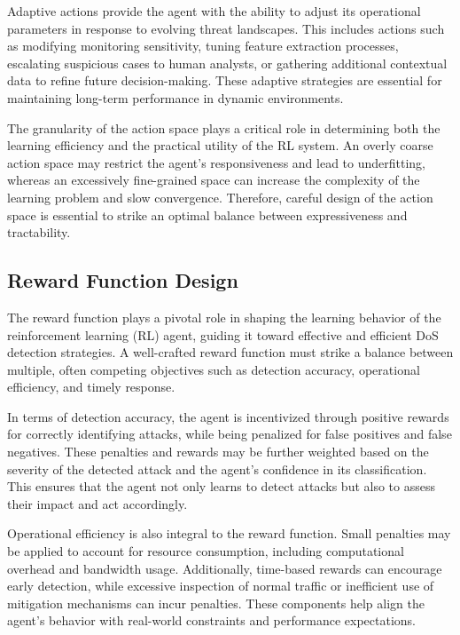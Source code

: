 \documentclass[12pt]{report}
\begin{document}
Adaptive actions provide the agent with the ability to adjust its operational parameters in response to evolving threat landscapes. This includes actions such as modifying monitoring sensitivity, tuning feature extraction processes, escalating suspicious cases to human analysts, or gathering additional contextual data to refine future decision-making. These adaptive strategies are essential for maintaining long-term performance in dynamic environments.

The granularity of the action space plays a critical role in determining both the learning efficiency and the practical utility of the RL system. An overly coarse action space may restrict the agent's responsiveness and lead to underfitting, whereas an excessively fine-grained space can increase the complexity of the learning problem and slow convergence. Therefore, careful design of the action space is essential to strike an optimal balance between expressiveness and tractability.


\subsection{Reward Function Design}

The reward function plays a pivotal role in shaping the learning behavior of the reinforcement learning (RL) agent, guiding it toward effective and efficient DoS detection strategies. A well-crafted reward function must strike a balance between multiple, often competing objectives such as detection accuracy, operational efficiency, and timely response.

In terms of detection accuracy, the agent is incentivized through positive rewards for correctly identifying attacks, while being penalized for false positives and false negatives. These penalties and rewards may be further weighted based on the severity of the detected attack and the agent’s confidence in its classification. This ensures that the agent not only learns to detect attacks but also to assess their impact and act accordingly.

Operational efficiency is also integral to the reward function. Small penalties may be applied to account for resource consumption, including computational overhead and bandwidth usage. Additionally, time-based rewards can encourage early detection, while excessive inspection of normal traffic or inefficient use of mitigation mechanisms can incur penalties. These components help align the agent’s behavior with real-world constraints and performance expectations.
\end{document}
